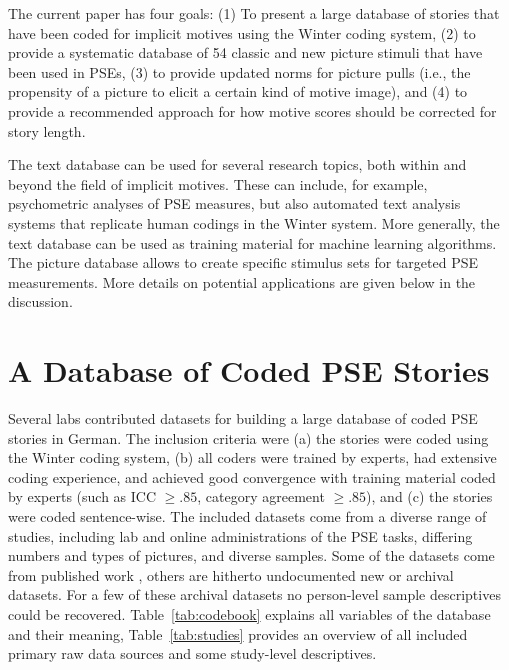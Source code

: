 \documentclass[man,a4paper,mask]{apa6}
\begin{document}
The current paper has four goals: (1) To present a large database of stories that have been coded for implicit motives using the Winter coding system, (2) to provide a systematic database of 54 classic and new picture stimuli that have been used in PSEs, (3) to provide updated norms for picture pulls (i.e., the propensity of a picture to elicit a certain kind of motive image), and (4) to provide a recommended approach for how motive scores should be corrected for story length.

The text database can be used for several research topics, both within and beyond the field of implicit motives. These can include, for example, psychometric analyses of PSE measures, but also automated text analysis systems that replicate human codings in the Winter system. More generally, the text database can be used as training material for machine learning algorithms. The picture database allows to create specific stimulus sets for targeted PSE measurements. More details on potential applications are given below in the discussion.


\section{A Database of Coded PSE Stories}

Several labs contributed datasets for building a large database of coded PSE stories in German. The inclusion criteria were (a) the stories were coded using the Winter coding system, (b) all coders were trained by experts, had extensive coding experience, and achieved good convergence with training material coded by experts (such as ICC $\geq .85$, category agreement $\geq .85$), and (c) the stories were coded sentence-wise.
The included datasets come from a diverse range of studies, including lab and online administrations of the PSE tasks, differing numbers and types of pictures, and diverse samples. Some of the datasets come from published work \parencite{kollner_SocialBiopsychologyImplicit_2018,kollner_InfluenceImplicitMotives_2015,janson_InhibitedPowerMotivation_2018a,janson_ImplicitPowerMotive_2017,zygar_EinflussEmotionalerIntelligenz_2013,czikmantori_ExperienceIntrinsicMotivation_2018}, others are hitherto undocumented new or archival datasets. For a few of these archival datasets no person-level sample descriptives could be recovered. Table~\ref{tab:codebook} explains all variables of the database and their meaning, Table~\ref{tab:studies} provides an overview of all included primary raw data sources and some study-level descriptives.
\end{document}
